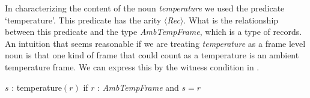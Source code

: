    


In characterizing the content of the noun \textit{temperature} we used
the predicate `temperature'.  This predicate has the arity
$\langle$\textit{Rec}$\rangle$.  What is the relationship between this
predicate and the type \textit{AmbTempFrame}, which is a type of
records.  An intuition that seems reasonable if we are treating
\textit{temperature} as a frame level noun is that one kind of frame
that could count as a temperature is an ambient temperature frame.  We
can express this by the witness condition in \nexteg{}.
\begin{ex} 
  $s$ : temperature$(r)$ if $r$ : \textit{AmbTempFrame} and $s=r$
  \label{ex:temperature-witcond}
\end{ex}

